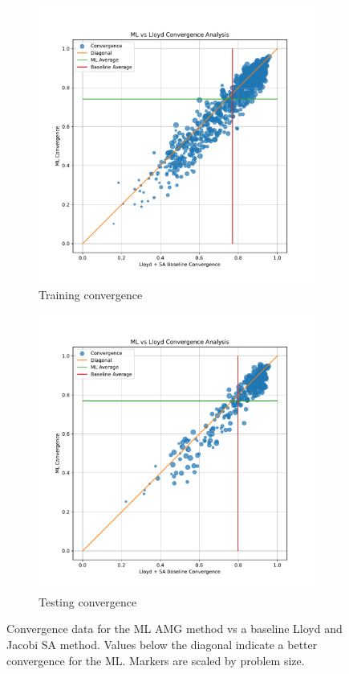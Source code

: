 \documentclass{article}
\begin{document}
\begin{figure}[h]
  \centering
  \begin{subfigure}[t]{0.49\textwidth}
    \centering
    \includegraphics[width=\textwidth]{aniso_train_convergence.pdf}
    \caption{Training convergence}
  \end{subfigure}
  \begin{subfigure}[t]{0.49\textwidth}
    \centering
    \includegraphics[width=\textwidth]{aniso_test_convergence.pdf}
    \caption{Testing convergence}
  \end{subfigure}
  \caption{Convergence data for the ML AMG method vs a baseline Lloyd and Jacobi SA method.  Values below the diagonal indicate a better convergence for the ML.  Markers are scaled by problem size.}
  \label{fig:aniso_conv}
\end{figure}
\end{document}
